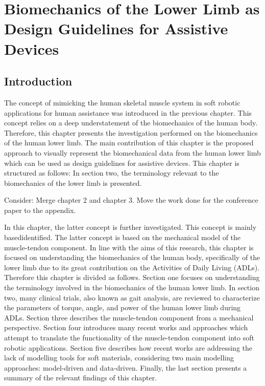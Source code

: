 \chapter{Biomechanics of the Lower Limb as Design Guidelines for Assistive Devices} \label{sec:mimicHSMS}

\section{Introduction}

The concept of mimicking the human skeletal muscle system in soft robotic applications for human assistance was introduced in the previous chapter. This concept relies on a deep understatement of the biomechanics of the human body. Therefore, this chapter presents the investigation performed on the biomechanics of the human lower limb. The main contribution of this chapter is the proposed approach to visually represent the biomechanical data from the human lower limb which can be used as design guidelines for assistive devices. This chapter is structured as follows:
In section two, the terminology relevant to the biomechanics of the lower limb is presented. 


Consider: Merge chapter 2 and chapter 3. Move the work done for the conference paper to the appendix.

In this chapter, the latter concept is further investigated. This concept is mainly basedidentified. The latter concept is based on the mechanical model of the muscle-tendon component. In line with the aims of this research, this chapter is focused on understanding the biomechanics of the human body, specifically of the lower limb due to its great contribution on the Activities of Daily Living (ADLs). Therefore this chapter is divided as follows.
Section one focuses on understanding the terminology involved in the biomechanics of the human lower limb. In section two, many clinical trials, also known as gait analysis, are reviewed to characterize the parameters of torque, angle, and power of the human lower limb during ADLs. Section three describes the muscle-tendon component from a mechanical perspective. Section four introduces many recent works and approaches which attempt to translate the functionality of the muscle-tendon component into soft robotic applications. Section five describes how recent works are addressing the lack of modelling tools for soft materials, considering two main modelling approaches: model-driven and data-driven. Finally, the last section presents a summary of the relevant findings of this chapter.

